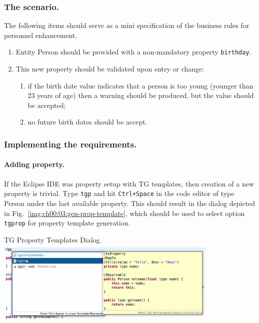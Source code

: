   \subsubsection*{The scenario.} 
  The following items should serve as a mini specification of the business rules for personnel enhancement.
  
  \begin{enumerate}
    \item Entity Person should be provided with a non-mandatory property \texttt{birthday}.
    \item This new property should be validated upon entry or change: 
	\begin{enumerate}
	  \item if the birth date value indicates that a person is too young (younger than 23 years of age) then a warning should be produced, but the value should be accepted;
	  \item no future birth dates should be accept.
	\end{enumerate}
  \end{enumerate}

  \subsubsection*{Implementing the requirements.}

  \paragraph*{Adding property.} 
  If the Eclipse IDE was property setup with TG templates, then creation of a new property is trivial.
  Type \texttt{tgp} and hit \texttt{Ctrl+Space} in the code editor of type Person under the last available property.
  This should result in the dialog depicted in Fig.~\ref{img:ch00:03:gen-prop-template}, which should be used to select option \texttt{tgprop} for property template generation.

  \begin{image}{TG Property Templates Dialog.}{\label{img:ch00:03:gen-prop-template}}
    \includegraphics[width=0.8\textwidth]{parts/00-part/chapters/02-making-changes/images/02-birthday-property-gen.png}
  \end{image}

